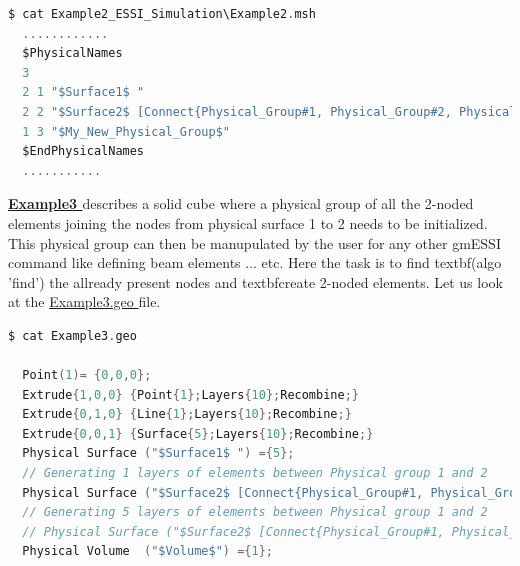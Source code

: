 \documentclass[11pt]{article}
\begin{document}
\begin{lstlisting}[language=C]
$ cat Example2_ESSI_Simulation\Example2.msh
  ............
  $PhysicalNames
  3
  2 1 "$Surface1$ "
  2 2 "$Surface2$ [Connect{Physical_Group#1, Physical_Group#2, Physical_Group#2, 0/0/1, 1, 1, create, 0.005, My_New_Physical_Group}]"
  1 3 "$My_New_Physical_Group$"
  $EndPhysicalNames
  ...........
\end{lstlisting}

\noindent \textbf{\href{http://beta.sumeetsinha.in/gmESSI/Examples/Example3}{ Example3 }}
describes a solid cube where a physical group of all the 2-noded elements
joining the nodes from physical surface 1 to 2 needs to be initialized. This
physical group can then be manupulated by the user for any other gmESSI command
like defining beam elements ... etc. Here the task is to find textbf{(algo
'find')} the allready present nodes and textbf{create 2-noded elements}. Let us
look at the
\href{http://beta.sumeetsinha.in/gmESSI/Examples/Example3/Example3.geo}{
Example3.geo } file.

\begin{lstlisting}[language=C]
$ cat Example3.geo

  Point(1)= {0,0,0}; 
  Extrude{1,0,0} {Point{1};Layers{10};Recombine;}
  Extrude{0,1,0} {Line{1};Layers{10};Recombine;}
  Extrude{0,0,1} {Surface{5};Layers{10};Recombine;}
  Physical Surface ("$Surface1$ ") ={5};
  // Generating 1 layers of elements between Physical group 1 and 2
  Physical Surface ("$Surface2$ [Connect{Physical_Group#1, Physical_Group#2, Physical_Group#3, 0\0\1, 1, 1, find, 0.005}]") ={27};
  // Generating 5 layers of elements between Physical group 1 and 2
  // Physical Surface ("$Surface2$ [Connect{Physical_Group#1, Physical_Group#2, Physical_Group#3, 0\0\1, 0.2, 5, find, 0.005}]") ={27};
  Physical Volume  ("$Volume$") ={1};

\end{lstlisting}
\end{document}
